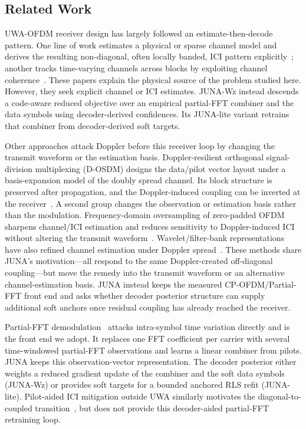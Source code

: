 \documentclass[journal]{IEEEtran}
\newcommand{\juna}{JUNA}
\newcommand{\junalite}{JUNA-lite}
\newcommand{\junawz}{JUNA-Wz}
\begin{document}
\subsection{Related Work}\label{sec:related}
UWA-OFDM receiver design has largely followed an estimate-then-decode pattern.
One line of work estimates a physical or sparse channel model and derives the
resulting non-diagonal, often locally banded, ICI pattern
explicitly~\cite{berger2010sparse}; another tracks time-varying channels across
blocks by exploiting channel coherence~\cite{zwang2012clustered}. These papers
explain the physical source of the problem studied here. However, they seek
explicit channel or ICI estimates. \junawz{} instead descends a code-aware
reduced objective over an empirical partial-FFT combiner and the data symbols
using decoder-derived confidences. Its \junalite{} variant retrains that
combiner from decoder-derived soft targets.

Other approaches attack Doppler before this receiver loop by changing the
transmit waveform or the estimation basis. Doppler-resilient orthogonal
signal-division multiplexing (D-OSDM) designs the data/pilot vector layout under
a basis-expansion model of the doubly spread channel. Its block structure is
preserved after propagation, and the Doppler-induced coupling can be inverted at
the receiver~\cite{ebihara2016dosdm}. A second group changes the observation or
estimation basis rather than the modulation. Frequency-domain oversampling of
zero-padded OFDM sharpens channel/ICI estimation and reduces sensitivity to
Doppler-induced ICI without altering the transmit waveform~\cite{wang2012fdoversampling}.
Wavelet/filter-bank representations have also refined channel estimation under
Doppler spread~\cite{tang2018haarwavelet}. These methods share \juna{}'s
motivation---all respond to the same Doppler-created off-diagonal coupling---but
move the remedy into the transmit waveform or an alternative channel-estimation
basis. \juna{} instead keeps the measured CP-OFDM/Partial-FFT front end and asks
whether decoder posterior structure can supply additional soft anchors once
residual coupling has already reached the receiver.

Partial-FFT demodulation~\cite{yerramalli2012partialfft} attacks intra-symbol
time variation directly and is the front end we adopt. It replaces one FFT
coefficient per carrier with several time-windowed partial-FFT observations and learns a
linear combiner from pilots. \juna{} keeps this observation-vector
representation. The decoder posterior either weights a reduced gradient update
of the combiner and the soft data symbols (\junawz{}) or provides soft targets
for a bounded anchored RLS refit (\junalite{}). Pilot-aided ICI mitigation outside UWA
similarly motivates the diagonal-to-coupled transition~\cite{mostofi2005ici},
but does not provide this decoder-aided partial-FFT retraining loop.
\end{document}
